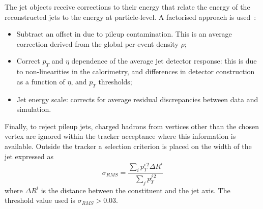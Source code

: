 The jet objects receive corrections to their energy that relate the energy of the reconstructed jets to the energy at particle-level. A factorised approach is used~\cite{JetPerformance}:
\begin{itemize}[noitemsep]
    \item Subtract an offset in \pt due to pileup contamination. This is an average correction derived from the global per-event density $\rho$;
    \item Correct $p_{T}$ and $\eta$ dependence of the average jet detector response: this is due to non-linearities in the calorimetry, and differences in detector construction as a function of $\eta$, and $p_{T}$ thresholds;
    \item Jet energy scale: corrects for average residual discrepancies between data and simulation.
\end{itemize}

Finally, to reject pileup jets, charged hadrons from vertices other than the chosen vertex are ignored within the tracker acceptance where this information is available. Outside the tracker a selection criterion is placed on the width of the jet expressed as
\begin{equation}
    \sigma_{RMS} = \frac{\sum_{i}p_{T}^{i\,2}\Delta{R}^{i}}{\sum_{j}p_{T}^{j\,2}}
\end{equation}
where $\Delta{R}^{i}$ is the distance between the constituent and the jet axis. The threshold value used is $\sigma_{RMS} > 0.03$. 



